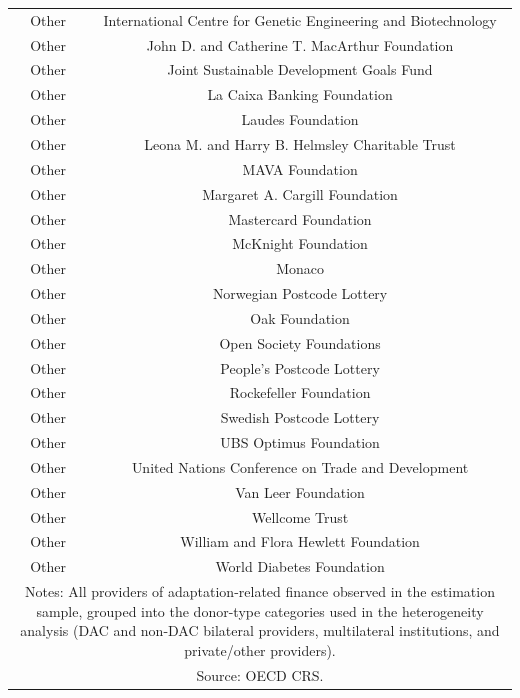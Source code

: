 \begin{longtable}{cc}
Other & International Centre for Genetic Engineering and Biotechnology \\
Other & John D. and Catherine T. MacArthur Foundation \\
Other & Joint Sustainable Development Goals Fund \\
Other & La Caixa Banking Foundation \\
Other & Laudes Foundation \\
Other & Leona M. and Harry B. Helmsley Charitable Trust \\
Other & MAVA Foundation \\
Other & Margaret A. Cargill Foundation \\
Other & Mastercard Foundation \\
Other & McKnight Foundation \\
Other & Monaco \\
Other & Norwegian Postcode Lottery \\
Other & Oak Foundation \\
Other & Open Society Foundations \\
Other & People's Postcode Lottery \\
Other & Rockefeller Foundation \\
Other & Swedish Postcode Lottery \\
Other & UBS Optimus Foundation \\
Other & United Nations Conference on Trade and Development \\
Other & Van Leer Foundation \\
Other & Wellcome Trust \\
Other & William and Flora Hewlett Foundation \\
Other & World Diabetes Foundation \\
\multicolumn{2}{p{\dimexpr\linewidth-4\tabcolsep}}{\footnotesize Notes: All providers of adaptation-related finance observed in the estimation sample, grouped into the donor-type categories used in the heterogeneity analysis (DAC and non-DAC bilateral providers, multilateral institutions, and private/other providers).} \\
\multicolumn{2}{p{\dimexpr\linewidth-4\tabcolsep}}{\footnotesize Source: OECD CRS.} \\
\end{longtable}
